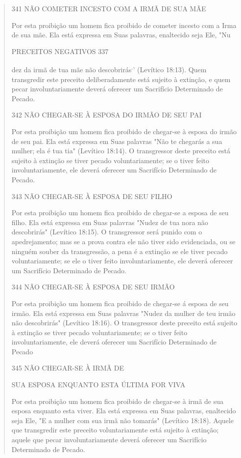 \begin{quote}
341 NÃO COMETER INCESTO COM A IRMÃ DE SUA MÃE

Por esta proibição um homem fica proibido de cometer incesto com a Irma
de sua mãe. Ela está expressa em Suas palavras, enaltecido seja Ele, "Nu

PRECEITOS NEGATIVOS 337

dez da irmã de tua mãe não descobrirás\textsuperscript{.}' (Levítico
18:13). Quem transgredir este preceito deliberadamente está sujeito à
extinção, e quem pecar involunta­riamente deverá oferecer um Sacrifício
Determinado de Pecado.

342 NÃO CHEGAR-SE À ESPOSA DO IRMÃO DE SEU PAI

Por esta proibição um homem fica proibido de chegar-se à esposa do irmão
de seu pai. Ela está expressa em Suas palavras "Não te chegarás a sua
mulher; ela é tua tia" (Levítico 18:14). O transgressor deste preceito
está sujei­to à extinção se tiver pecado voluntariamente; se o tiver
feito involuntariamen­te, ele deverá oferecer um Sacrifício Determinado
de Pecado.

343 NÃO CHEGAR-SE À ESPOSA DE SEU FILHO

Por esta proibição um homem fica proibido de chegar-se a esposa de seu
filho. Ela está expressa em Suas palavras "Nudez de tua nora não
descobrirás" (Levítico 18:15). O transgressor será punido com o
apedrejamento; mas se a pro­va contra ele não tiver sido evidenciada, ou
se ninguém souber da transgressão, a pena é a extinção se ele tiver
pecado voluntariamente; se ele o tiver feito invo­luntariamente, ele
deverá oferecer um Sacrifício Determinado de Pecado.

344 NÃO CHEGAR-SE À ESPOSA DE SEU IRMÃO

Por esta proibição um homem fica proibido de chegar-se á esposa de seu
irmão. Ela está expressa em Suas palavras "Nudez da mulher de teu ir­mão
não descobrirás" (Levítico 18:16). O transgressor deste preceito está
sujei­to à extinção se tiver pecado voluntariamente; se o tiver feito
involuntariamen­te, ele deverá oferecer um Sacrifício Determinado de
Pecado

345 NÃO CHEGAR-SE À IRMÃ DE

SUA ESPOSA ENQUANTO ESTA ÚLTIMA FOR VIVA

Por esta proibição um homem fica proibido de chegar-se à irmã de sua
esposa enquanto esta viver. Ela está expressa em Suas palavras,
enaltecido seja Ele, "E a mulher com sua irmã não tomarás" (Levítico
18:18). Aquele que transgredir este preceito voluntariamente está
sujeito à extinção; aquele que pe­car involuntariamente deverá oferecer
um Sacrifício Determinado de Pecado.


\end{quote}

